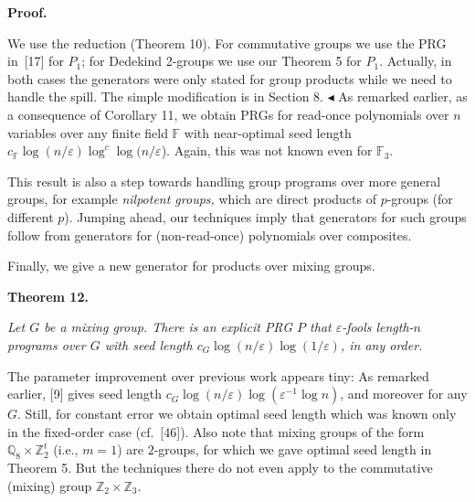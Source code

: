 \documentclass[10pt,a4paper]{article}
\begin{document}
\par\medskip\noindent\textbf{Proof.}\par




We use the reduction (Theorem 10). For commutative groups
we use the PRG in [17] for $P_{1}$; for Dedekind
2-groups we use our Theorem 5 for $P_{1}$. Actually,
in both cases the generators were only stated for group products while
we need to handle the spill. The simple modification is in Section 8.
$\blacktriangleleft$
As remarked earlier, as a consequence of Corollary 11, we obtain
PRGs for read-once polynomials over $n$ variables over any finite field
$\mathbb{F}$ with near-optimal seed length $c_{\mathbb{F}}\log(n/\varepsilon)\log^{c}\log(n/\varepsilon$).
Again, this was not known even for $\mathbb{F}_{3}$.\par




This result is also a step towards handling group programs over more
general groups, for example \emph{nilpotent groups,} which are direct
products of $p$-groups (for different $p$). Jumping ahead, our techniques imply that generators for such groups follow from generators for (non-read-once) polynomials over composites.\par




Finally, we give a new generator for products over mixing groups.\par





\par\medskip\noindent\textbf{
\textbf{Theorem 12}\textbf{.}
}\par



\emph{Let $G$ be a mixing group. There is an explicit PRG $P$ that $\varepsilon$-fools length-$n$ programs
over $G$ with seed length $c_{G}\log(n/\varepsilon)\log(1/\varepsilon)$, in any order.}\par






The parameter improvement over previous work appears tiny: As remarked
earlier, [9] gives seed length
$c_{G}\log(n/\varepsilon)\log(\varepsilon^{-1}\log n)$, and moreover for any $G$.
Still, for constant error we obtain optimal seed length which was
known only in the fixed-order case (cf. [46]).
Also note that mixing groups of the form $\mathbb{Q}_{8}\times\mathbb{Z}_{2}^{t}$
(i.e., $m=1$) are $2$-groups, for which we gave optimal seed length
in Theorem 5. But the techniques there do not even
apply to the commutative (mixing) group $\mathbb{Z}_{2}\times\mathbb{Z}_{3}$.\par
\end{document}
